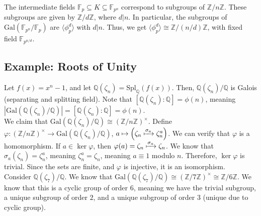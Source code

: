 \documentclass[10pt]{extarticle}
\newcommand{\Q}{\mathbb{Q}}
\newcommand{\Z}{\mathbb{Z}}
\begin{document}
  The intermediate fields $\mathbb{F}_{p} \subseteq K\subseteq \mathbb{F}_{p^n}$ correspond to subgroups of $\Z/n\Z$. These subgroups are given by $\Z/d\Z$, where $d|n$. In particular, the subgroups of $\text{Gal}(\mathbb{F}_{p^n}/\mathbb{F}_p)$ are $\langle \phi_p^{d}\rangle$ with $d|n$. Thus, we get $\langle \phi_{p}^d\rangle \cong \Z/(n/d)\Z$, with fixed field $\mathbb{F}_{p^{n/d}}$.
  \subsection{Example: Roots of Unity}%
  Let $f(x) = x^n - 1$, and let $\Q(\zeta_n) = \text{Spl}_{\Q}\left(f(x)\right)$. Then, $\Q(\zeta_n)/\Q$ is Galois (separating and splitting field). Note that $[\Q(\zeta_n):\Q] = \phi(n)$, meaning $|\text{Gal}\left(\Q(\zeta_n)/\Q\right)| = [\Q(\zeta_n):\Q] = \phi(n)$.\\

  We claim that $\text{Gal}\left(\Q(\zeta_n)/\Q\right) \cong (\Z/n\Z)^{\times}$. Define $\varphi: (\Z/n\Z)^{\times} \rightarrow \text{Gal}\left(\Q(\zeta_n)/\Q\right)$, $a\mapsto \left(\zeta_n \xmapsto{\sigma_a} \zeta_n^a\right)$. We can verify that $\varphi$ is a homomorphism. If $a\in \ker\varphi$, then $\varphi(a) = \zeta_n\xmapsto{\sigma_a}\zeta_n$. We know that $\sigma_a(\zeta_n) = \zeta_n^a$, meaning $\zeta_n^a = \zeta_n$, meaning $a\equiv 1$ modulo $n$. Therefore, $\ker\varphi$ is trivial. Since the sets are finite, and $\varphi$ is injective, it is an isomorphism.\\

  Consider $\Q(\zeta_7)/\Q$. We know that $\text{Gal}\left(\Q(\zeta_7)/\Q\right)\cong (\Z/7\Z)^{\times} \cong \Z/6\Z$. We know that this is a cyclic group of order $6$, meaning we have the trivial subgroup, a unique subgroup of order $2$, and a unique subgroup of order $3$ (unique due to cyclic group).\\
\end{document}
